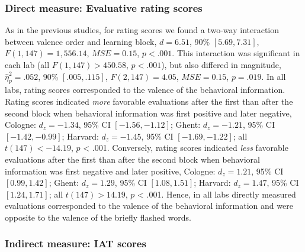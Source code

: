\documentclass[
  man,floatsintext]{apa6}
\begin{document}
\hypertarget{direct-measure-evaluative-rating-scores}{%
\subsubsection{Direct measure: Evaluative rating scores}\label{direct-measure-evaluative-rating-scores}}

As in the previous studies, for rating scores we found a two-way interaction between valence order and learning block, \(d = 6.51\), 90\% \([5.69, 7.31]\), \(F(1, 147) = 1,556.14\), \(\mathit{MSE} = 0.15\), \(p < .001\).
This interaction was significant in each lab (all \(F(1, 147) > 450.58\), \(p < .001\)), but also differed in magnitude, \(\hat\eta^2_p = .052\), 90\% \([.005, .115]\), \(F(2, 147) = 4.05\), \(\mathit{MSE} = 0.15\), \(p = .019\).
In all labs, rating scores corresponded to the valence of the behavioral information.
Rating scores indicated \emph{more} favorable evaluations after the first than after the second block when behavioral information was first positive and later negative,
Cologne: \(d_z = -1.34\), 95\% CI \([-1.56, -1.12]\);
Ghent: \(d_z = -1.21\), 95\% CI \([-1.42, -0.99]\);
Harvard: \(d_z = -1.45\), 95\% CI \([-1.69, -1.22]\);
all \(t(147) < -14.19\), \(p\) \textless{} .001.
Conversely, rating scores indicated \emph{less} favorable evaluations after the first than after the second block when behavioral information was first negative and later positive,
Cologne: \(d_z = 1.21\), 95\% CI \([0.99, 1.42]\);
Ghent: \(d_z = 1.29\), 95\% CI \([1.08, 1.51]\);
Harvard: \(d_z = 1.47\), 95\% CI \([1.24, 1.71]\);
all \(t(147) > 14.19\), \(p\) \textless{} .001.
Hence, in all labs directly measured evaluations corresponded to the valence of the behavioral information and were opposite to the valence of the briefly flashed words.

\hypertarget{indirect-measure-iat-scores}{%
\subsubsection{Indirect measure: IAT scores}\label{indirect-measure-iat-scores}}
\end{document}

